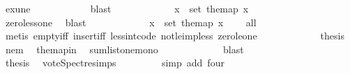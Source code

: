 \begin{isabellebody}
\ exune\isanewline
\ \ \ \ \ \ \ \ \ \ \isamarkupfalse%
\ blast\ \isanewline
\ \ \ \ \ \ \ \ \isamarkupfalse%
\ \isamarkupfalse%
\ {\isachardoublequoteopen}{\isasymexists}x\ {\isasymin}\ set\ the{\isacharunderscore}{\kern0pt}map{\isachardot}{\kern0pt}\ x\ {\isachargreater}{\kern0pt}\ {}{\isachardoublequoteclose}\isanewline
\ \ \ \ \ \ \ \ \ \ \isamarkupfalse%
\ zero{\isacharunderscore}{\kern0pt}less{\isacharunderscore}{\kern0pt}one\ \isamarkupfalse%
\ blast\ \isanewline
\ \ \ \ \ \ \ \ \isamarkupfalse%
\ \isamarkupfalse%
\ {\isachardoublequoteopen}{\isasymforall}x\ {\isasymin}\ set\ the{\isacharunderscore}{\kern0pt}map{\isachardot}{\kern0pt}\ x\ {\isasymge}\ {}{\isachardoublequoteclose}\ \isamarkupfalse%
\ all{}{}{\isacharunderscore}{\kern0pt}{}\isanewline
\ \ \ \ \ \ \ \ \ \ \isamarkupfalse%
\ {\isacharparenleft}{\kern0pt}metis\ empty{\isacharunderscore}{\kern0pt}iff\ insert{\isacharunderscore}{\kern0pt}iff\ less{\isacharunderscore}{\kern0pt}int{\isacharunderscore}{\kern0pt}code{\isacharparenleft}{\kern0pt}{}{\isacharparenright}{\kern0pt}\ not{\isacharunderscore}{\kern0pt}le{\isacharunderscore}{\kern0pt}imp{\isacharunderscore}{\kern0pt}less\ zero{\isacharunderscore}{\kern0pt}le{\isacharunderscore}{\kern0pt}one{\isacharparenright}{\kern0pt}\ \isanewline
\ \ \ \ \ \ \ \ \isamarkupfalse%
\ \isamarkupfalse%
\ {\isacharquery}{\kern0pt}thesis\ \isamarkupfalse%
\ nem\ \isamarkupfalse%
\ the{\isacharunderscore}{\kern0pt}map{\isacharunderscore}{\kern0pt}in\ \isamarkupfalse%
\ sumlist{\isacharunderscore}{\kern0pt}one{\isacharunderscore}{\kern0pt}mono\ \isanewline
\ \ \ \ \ \ \ \ \ \ \isamarkupfalse%
\ blast\ \ \isanewline
\ \ \ \ \ \ \isamarkupfalse%
\isanewline
\ \ \ \ \ \isamarkupfalse%
\ \isamarkupfalse%
\ {\isacharquery}{\kern0pt}thesis\ \isamarkupfalse%
\ vote{\isacharunderscore}{\kern0pt}Spectre{\isachardot}{\kern0pt}simps\isanewline
\ \ \ \ \ \ \ \isamarkupfalse%
\ {\isacharparenleft}{\kern0pt}simp\ add{\isacharcolon}{\kern0pt}\ four{\isacharparenright}{\kern0pt}\isanewline
\ \ \ \isamarkupfalse%
\isanewline
\ \isamarkupfalse%
%
\endisatagproof
{\isafoldproof}%
%
\isadelimproof
\isanewline
%
\endisadelimproof
\isanewline

\end{isabellebody}
